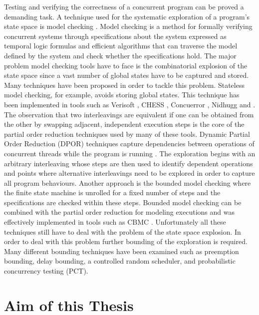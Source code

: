 Testing and verifying the correctness of a concurrent program can be proved a demanding task. 
A technique used for the systematic exploration of a program's state space is model checking \cite{WikipediaModelChecking}.
Model checking is a method for formally verifying concurrent systems through specifications about the system expressed as 
temporal logic formulas and efficient algorithms that can traverse the model defined by the system and check whether
the specifications hold. The major problem model checking tools have to face is the combinatorial explosion of the state space since
a vast number of global states have to be captured and stored. Many techniques have been proposed in order to tackle this problem.
Stateless model checking, for example, avoids storing global states. This technique has been implemented in tools such as Verisoft \cite{SMC,Gode05}, 
CHESS \cite{Musu08}, Concuerror \cite{Chri13}, Nidhugg \cite{AbdullaAronisAtigJonssonLeonardssonSagonasSMC2015} and \cite{RCMC}. The observation that two 
interleavings are equivalent if one can be obtained from the other by swapping adjacent, independent execution steps is the core of the partial
order reduction \cite{Valmari1991, Peled1993, Godefroid1996,POR,JACM} techniques used by many of these tools. Dynamic Partial Order Reduction (DPOR) techniques
capture dependencies between operations of concurrent threads while the program is running \cite{FlanaganDPOR}. The exploration begins with an arbitrary interleaving whose steps are then
used to identify dependent operations and points where alternative interleavings need to
be explored in order to capture all program behaviours. Another approach is the bounded model checking \cite{BoundedModelChecking} where the finite state
machine is unrolled for a fixed number of steps and the specifications are checked within these steps. Bounded model checking can be combined with the partial
order reduction for modeling executions \cite{PORinBMC} and was effectively implemented in tools such as CBMC \cite{CBMC}.
Unfortunately all these techniques still have to deal with the problem of the state space explosion. In order to deal with this problem further
bounding of the exploration is required. Many different bounding techniques have been examined \cite{Thomson} such as preemption bounding, delay
bounding, a controlled random scheduler, and probabilistic concurrency testing (PCT).

\section{Aim of this Thesis}

